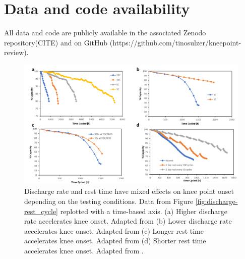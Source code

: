 \documentclass[journal=jpcl, manuscript=article, layout=onecolumn]{achemso}
\begin{document}
\section{Data and code availability}

All data and code are publicly available in the associated Zenodo repository(CITE) and on GitHub (https://github.com/tinosulzer/kneepoint-review).


\begin{figure}[ht]
\centering
\includegraphics[scale = 1.0]{figures/Discharge-rest_time.png}
\caption{Discharge rate and rest time have mixed effects on knee point onset depending on the testing conditions. Data from Figure \ref{fig:discharge-rest_cycle} replotted with a time-based axis. (a) Higher discharge rate accelerates knee onset. Adapted from \cite{omar_lithium_2014} (b) Lower discharge rate accelerates knee onset. Adapted from \cite{keil_linear_2019} (c) Longer rest time accelerates knee onset. Adapted from \cite{keil_linear_2019} (d) Shorter rest time accelerates knee onset. Adapted from \cite{epding_investigation_2019}.}
\label{fig:discharge-rest_time}
\end{figure}

% 

\end{document}
